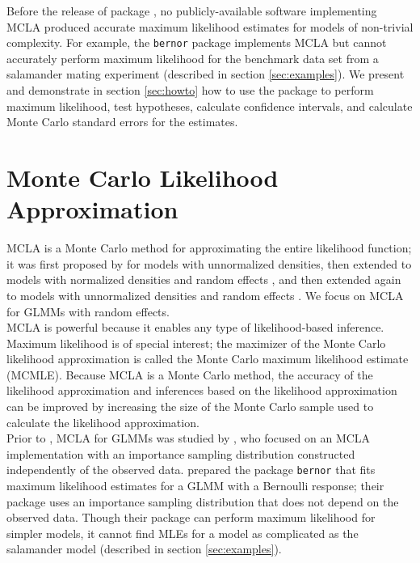 \documentclass[article]{jss}
\begin{document}
Before the release of  package , no publicly-available software  implementing MCLA  produced accurate maximum likelihood estimates for models of non-trivial complexity. For example, the \texttt{bernor}  package \citep{sung:geyer:2007} implements MCLA but cannot accurately perform maximum likelihood for the benchmark data set from a salamander mating experiment (described in section \ref{sec:examples}). 
We present     and demonstrate in section \ref{sec:howto} how to use the package to perform maximum likelihood, test hypotheses, calculate confidence intervals, and calculate Monte Carlo standard errors for the estimates.  




\section{Monte Carlo Likelihood Approximation}

MCLA is a  Monte Carlo method for approximating the entire likelihood function; it was first proposed by \citet{geyer:1990} for models with unnormalized densities, then extended to models with normalized densities and random effects \citep{thom:guo:1991}, and then extended again to models with unnormalized densities and random effects \citep{gelf:carl:1993}.
 We focus on  MCLA  for GLMMs with random effects.  \\

MCLA is powerful  because it enables any type of likelihood-based inference.  Maximum likelihood is of special interest; the maximizer of the Monte Carlo likelihood approximation is called the Monte Carlo maximum likelihood estimate (MCMLE). Because MCLA is a Monte Carlo method, the accuracy of the likelihood approximation and inferences based on the likelihood approximation  can be improved by increasing the size of the Monte Carlo sample used to calculate the likelihood approximation. \\


Prior to , MCLA for GLMMs was   studied by \citet{sung:geyer:2007}, who  focused on an MCLA implementation with an importance sampling distribution constructed independently of the observed data. \citet{sung:geyer:2007} prepared the  package \texttt{bernor} that  fits maximum likelihood estimates for a GLMM with a Bernoulli response; their package uses an importance sampling distribution that does not depend on the observed data. Though their package can perform maximum likelihood for simpler models,  it cannot find MLEs for a model as complicated as the salamander model (described in section \ref{sec:examples}).  \\
\end{document}
